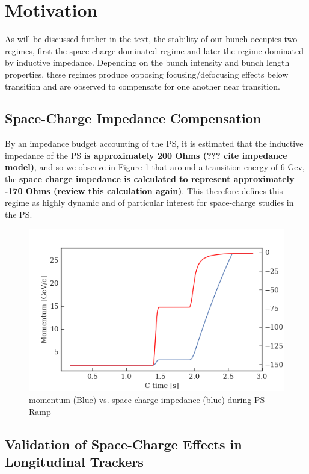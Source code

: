 \section{Motivation}

As will be discussed further in the text, the stability of our bunch occupies two regimes, first the space-charge dominated regime and later the regime dominated by inductive impedance. Depending on the bunch intensity and bunch length properties, these regimes produce opposing focusing/defocusing effects below transition and are observed to compensate for one another near transition.

\subsection{Space-Charge Impedance Compensation}

By an impedance budget accounting of the PS, it is estimated that the inductive impedance of the PS \textbf{is approximately 200 Ohms (??? cite impedance model)}, and so we observe in Figure \ref{fig:ps_impedance} that around a transition energy of 6 Gev, the \textbf{space charge impedance is calculated to represent approximately -170 Ohms (review this calculation again)}. This therefore defines this regime as highly dynamic and of particular interest for space-charge studies in the PS.

\begin{figure}
    \centering
    \includegraphics{figs/energy_v_space_charge_impedance.png}
    \caption{momentum (Blue) vs. space charge impedance (blue) during PS Ramp}
    \label{fig:ps_impedance}
\end{figure}

\subsection{Validation of Space-Charge Effects in Longitudinal Trackers}

